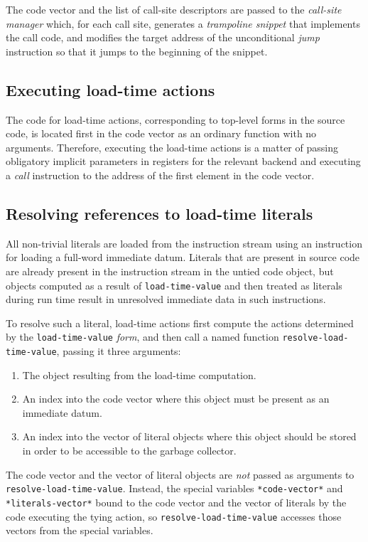 The code vector and the list of call-site descriptors are passed to
the \emph{call-site manager} which, for each call site, generates a
\emph{trampoline snippet} that implements the call code, and modifies
the target address of the unconditional \emph{jump} instruction so
that it jumps to the beginning of the snippet.

\subsection{Executing load-time actions}

The code for load-time actions, corresponding to top-level forms in
the source code, is located first in the code vector as an ordinary
function with no arguments.  Therefore, executing the load-time
actions is a matter of passing obligatory implicit parameters in
registers for the relevant backend and executing a \emph{call}
instruction to the address of the first element in the code vector.

\subsection{Resolving references to load-time literals}

All non-trivial literals are loaded from the instruction stream using
an instruction for loading a full-word immediate datum.  Literals that
are present in source code are already present in the instruction
stream in the untied code object, but objects computed as a result of
\texttt{load-time-value} and then treated as literals during run time
result in unresolved immediate data in such instructions.

To resolve such a literal, load-time actions first compute the actions
determined by the \texttt{load-time-value} \emph{form}, and then call
a named function \texttt{resolve-load-time-value}, passing it three
arguments:

\begin{enumerate}
\item The object resulting from the load-time computation.
\item An index into the code vector where this object must be present
  as an immediate datum.
\item An index into the vector of literal objects where this object
  should be stored in order to be accessible to the garbage
  collector.
\end{enumerate}

The code vector and the vector of literal objects are \emph{not}
passed as arguments to \texttt{resolve-load-time-value}.  Instead, the
special variables \texttt{*code-vector*} and
\texttt{*literals-vector*} bound to the code vector and the vector of
literals by the code executing the tying action, so
\texttt{resolve-load-time-value} accesses those vectors from the
special variables.
